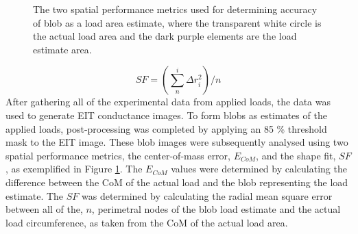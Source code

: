 \begin{figure}[H]
	\centering
	\hspace{1cm}
	\vspace{0.2cm}
	\caption{The two spatial performance metrics used for determining accuracy of blob as a load area estimate, where the transparent white circle is the actual load area and the dark purple elements are the load estimate area.}
	\label{fig:eg_spatial_metrics}
\end{figure}
\begin{equation}
	S\!F = \left( \sum^i_n \Delta r_i^2 \right) / n
	\label{eqn:sf}
\end{equation}
After gathering all of the experimental data from applied loads, the data was used to generate EIT conductance images. To form blobs as estimates of the applied loads, post-processing was completed by applying an 85 \% threshold mask to the EIT image. These blob images were subsequently analysed using two spatial performance metrics, the center-of-mass error, $E_{CoM}$, and the shape fit, $S\!F$, as exemplified in Figure \ref{fig:eg_spatial_metrics}. The $E_{CoM}$ values were determined by calculating the difference between the CoM of the actual load and the blob representing the load estimate. The $S\!F$ was determined by calculating the radial mean square error between all of the, $n$, perimetral nodes of the blob load estimate and the actual load circumference, as taken from the CoM of the actual load area.


